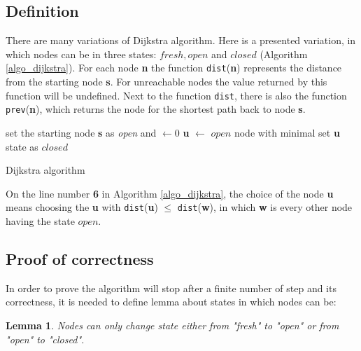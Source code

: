 \documentclass[thesis=M,english]{FITthesis}[2012/10/20]
\newtheorem{lemma}{Lemma}
\begin{document}
 \subsection{Definition}
There are many variations of Dijkstra algorithm. Here is a presented variation, in which nodes can be in three states: $fresh, open $ and $closed$ (Algorithm \ref{algo_dijkstra}). For each node \textbf{n} the function \texttt{dist}(\textbf{n}) represents the distance from the starting node \textbf{s}. For unreachable nodes the value returned by this function will be undefined. Next to the function \texttt{dist}, there is also the function \texttt{prev}(\textbf{n}), which returns the node for the shortest path back to node \textbf{s}.

\begin{algorithm}[H]
 set the starting node \textbf{s} as \textit{open} and $ \leftarrow 0$\;
 {
  \textbf{u} $\leftarrow$ $open$ node with minimal  \;
  set \textbf{u} state as $closed$	\;
  {
  } 
 }
\caption{Dijkstra algorithm}\label{algo_dijkstra}
\end{algorithm}

On the line number \textbf{6} in Algorithm \ref{algo_dijkstra}, the choice of the node \textbf{u} means choosing the \textbf{u} with \texttt{dist}(\textbf{u}) $ \leq $ \texttt{dist}(\textbf{w}), in which \textbf{w} is every other node having the state $open$.

\subsection{Proof of correctness}

In order to prove the algorithm will stop after a finite number of step and its correctness, it is needed to define lemma about states in which nodes can be:

\begin{lemma}
Nodes can only change state either from "\textit{fresh}" to "\textit{open}" or from "\textit{open}" to "\textit{closed}".
\end{lemma}
\end{document}
